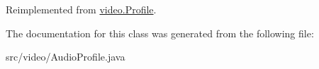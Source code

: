 Reimplemented from \hyperlink{classvideo_1_1_profile_a2272c75453c3b9d64ff63a43ed1f1e84}{video.Profile}.



The documentation for this class was generated from the following file:\begin{DoxyCompactItemize}
\item 
src/video/AudioProfile.java\end{DoxyCompactItemize}
